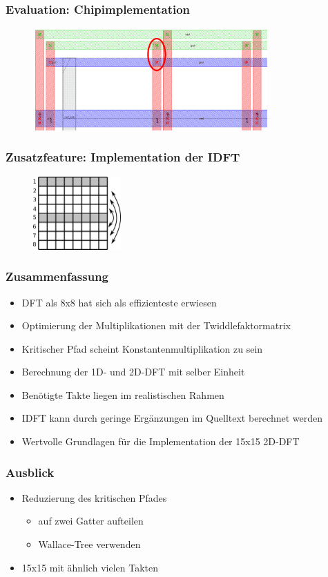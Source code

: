 \begin{frame}\frametitle{Evaluation: Chipimplementation}
 \begin{figure}
  \centering
  \includegraphics[width=0.8\textwidth]{img/Vias.png}
 \end{figure}
\end{frame}



\begin{frame}\frametitle{Zusatzfeature: Implementation der IDFT}
 \begin{figure}[ht]
 \centering
 \includegraphics[width=0.3\textwidth]{img/IDFT_Zeilentausch.png}
 \label{pic:IDFT_Zeilentausch}
\end{figure}
\end{frame}


\begin{frame}\frametitle{Zusammenfassung}
 \begin{itemize}
  \item DFT als 8x8 hat sich als effizienteste erwiesen
  \item Optimierung der Multiplikationen mit der Twiddlefaktormatrix
  \item Kritischer Pfad scheint Konstantenmultiplikation zu sein
  \item Berechnung der 1D- und 2D-DFT mit selber Einheit
  \item Benötigte Takte liegen im realistischen Rahmen
  \item IDFT kann durch geringe Ergänzungen im Quelltext berechnet werden
  \item Wertvolle Grundlagen für die Implementation der 15x15 2D-DFT
 \end{itemize}

\end{frame}


\begin{frame}\frametitle{Ausblick}
\begin{itemize}
 \item Reduzierung des kritischen Pfades
 \begin{itemize}
  \item auf zwei Gatter aufteilen
  \item Wallace-Tree verwenden
 \end{itemize}
 \item 15x15 mit ähnlich vielen Takten
\end{itemize}

 
\end{frame}




